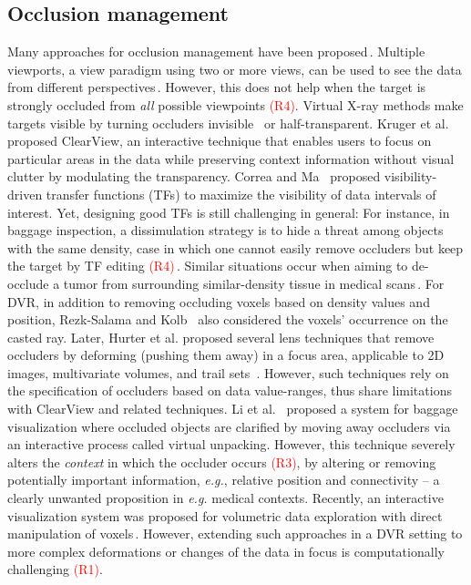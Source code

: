 \subsection{Occlusion management}
%
Many approaches for occlusion management have been proposed\,\cite{4483791}. Multiple viewports, a view paradigm using two or more views, can be used to see the data from different perspectives\,\cite{WangBaldonado:2000:GUM:345513.345271}. However, this does not help when the target is strongly occluded from \emph{all} possible viewpoints \textcolor{red}{(R4)}. Virtual X-ray methods make targets visible by turning occluders invisible~\cite{Burns:2008:ACC:1457515.1409107} or half-transparent. Kruger et al.~\cite{4015450} proposed ClearView, an interactive technique that enables users to focus on particular areas in the data while preserving context information without visual clutter by modulating the transparency. Correa and Ma~\cite{5416704} proposed visibility-driven transfer functions (TFs) to maximize the visibility of data intervals of interest. Yet, designing good TFs is still challenging in general: For instance, in baggage inspection, a dissimulation strategy is to hide a threat among objects with the same density, case in which one cannot easily remove occluders but keep the target by TF editing \textcolor{red}{(R4)}\,\cite{xxx}. Similar situations occur when aiming to de-occlude a tumor from surrounding similar-density tissue in medical scans\,\cite{xxx}. For DVR, in addition to removing occluding voxels based on density values and position, Rezk-Salama and Kolb~\cite{CGF:CGF979} also considered the voxels' occurrence on the casted ray. Later, Hurter et al. proposed several lens techniques that remove occluders by deforming (pushing them away) in a focus area, applicable to 2D images, multivariate volumes, and trail sets~\cite{moleview,6787171}. However, such techniques rely on the specification of occluders based on data value-ranges, thus share limitations with ClearView and related techniques. Li et al.~\cite{Li:2012:LVV:2425296.2425325} proposed a system for baggage visualization where occluded objects are clarified by moving away occluders via an interactive process called virtual unpacking. However, this technique severely alters the \emph{context} in which the occluder occurs \textcolor{red}{(R3)}, by altering or removing potentially important information, \emph{e.g.}, relative position and connectivity -- a clearly unwanted proposition in \emph{e.g.} medical contexts. Recently, an interactive visualization system was proposed for volumetric data exploration with direct manipulation of voxels\,\cite{7819413}. However, extending such approaches in a DVR setting to more complex deformations or changes of the data in focus is computationally challenging  \textcolor{red}{(R1)}.

